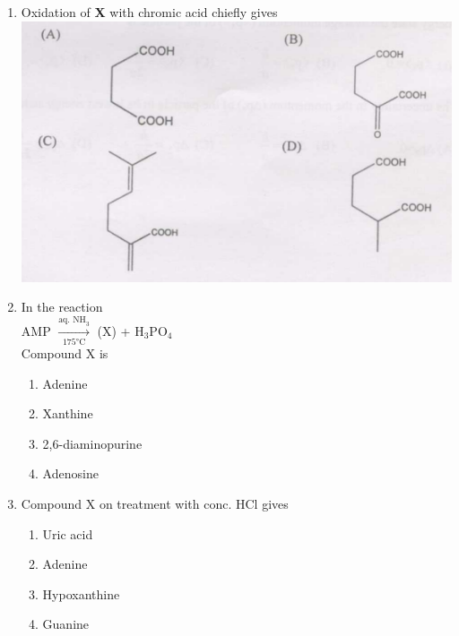 \documentclass[journal,12pt,onecolumn]{IEEEtran}
\theoremstyle{remark}
\begin{document}
\begin{enumerate}
\item  Oxidation of \textbf{X} with chromic acid chiefly gives 
 \hfill{}
 \includegraphics[width=15cm]{figs/image15.png} 
   

 \item  In the reaction\\
\hspace*{1cm} AMP \hspace{0.5cm} $\xrightarrow[\text{175°C}]{\text{aq. NH}_3}$ \hspace{0.5cm} (X) + H$_3$PO$_4$\\
Compound X is \hfill{}
\begin{multicols}{2}
\begin{enumerate}[label=(\Alph*)]
    \item Adenine
    \item Xanthine
    \item 2,6-diaminopurine
    \item Adenosine
\end{enumerate}
\end{multicols}
  

\item  Compound X on treatment with conc. HCl gives \hfill{}
\begin{multicols}{2}
\begin{enumerate}[label=(\Alph*)]
    \item Uric acid
    \item Adenine
    \item Hypoxanthine
    \item Guanine
\end{enumerate}
\end{multicols}
  


\end{enumerate}
\end{document}
